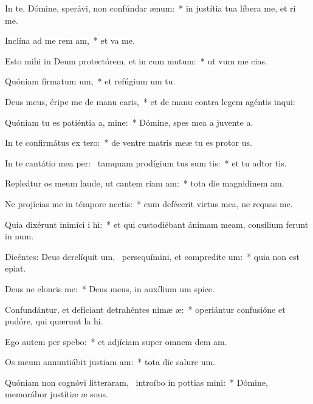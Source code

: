 \item In te, Dómine, sperávi, non confúndar  ænum:~* in justítia tua líbera me, et ri me.
\item Inclína ad me rem am,~* et va me.
\item Esto mihi in Deum protectórem, et in cum mutum:~* ut vum me cias.
\item Quóniam firmatum um,~* et refúgium um  tu.
\item Deus meus, éripe me de manu caris,~* et de manu contra legem agéntis  inqui:
\item Quóniam tu es patiéntia a, mine:~* Dómine, spes mea a juvente a.
\item In te confirmátus  ex tero:~* de ventre matris meæ tu es protor us.
\item In te cantátio mea per:~\pscross{} tamquam prodígium tus sum tis:~* et tu adtor tis.
\item Repleátur os meum laude, ut cantem riam am:~* tota die magnidinem am.
\item Ne projícias me in témpore nectis:~* cum defécerit virtus mea, ne requas me.
\item Quia dixérunt inimíci i hi:~* et qui custodiébant ánimam meam, consílium ferunt in num.
\item Dicéntes: Deus derelíquit um,~\pscross{} persequímini, et compredite um:~* quia non est  epiat.
\item Deus ne elonris  me:~* Deus meus, in auxílium um spice.
\item Confundántur, et defíciant detrahéntes nimæ æ:~* operiántur confusióne et pudóre, qui quærunt la hi.
\item Ego autem per spebo:~* et adjíciam super omnem dem am.
\item Os meum annuntiábit justiam am:~* tota die salure um.
\item Quóniam non cognóvi litteraram,~\pscross{} introíbo in pottias mini:~* Dómine, memorábor justítiæ æ sous.
